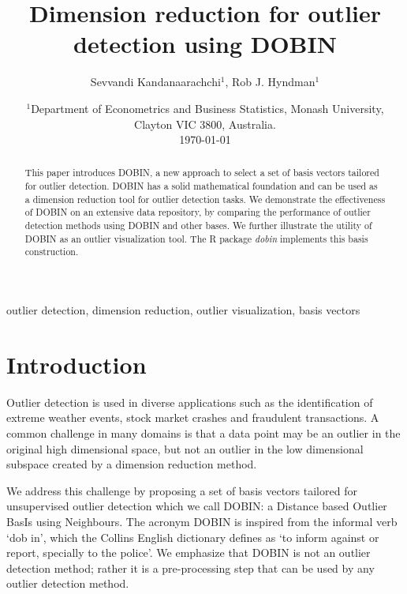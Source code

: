 \documentclass[letter,12pt]{article}
\begin{document}

\title{Dimension reduction for outlier detection using DOBIN}
\author{Sevvandi Kandanaarachchi$^1$, Rob J. Hyndman$^1$}
\date{%
   \scriptsize{ $^1$Department of Econometrics and Business Statistics, Monash University, Clayton VIC 3800, Australia.\\ [2ex]}%
    \today \\
}
\begin{titlingpage}
\maketitle

\begin{abstract}
	This paper introduces DOBIN, a new approach to select a set of basis vectors tailored for outlier detection. DOBIN has a solid mathematical foundation and can be used as a dimension reduction tool for outlier detection tasks. We demonstrate the effectiveness of DOBIN on an extensive data repository, by comparing the performance of outlier detection methods using DOBIN and other bases. We further illustrate the utility of DOBIN as an outlier visualization tool. The R package \textit{dobin} implements this basis construction.
\end{abstract}

\begin{keywords}outlier detection, dimension reduction, outlier visualization, basis vectors
\end{keywords}

\end{titlingpage}

\section{Introduction}

Outlier detection is used in diverse applications such as the identification of extreme weather events, stock market crashes and fraudulent transactions. A common challenge in many domains is that a data point may be an outlier in the original high dimensional space, but not an outlier in the low dimensional subspace created by a dimension reduction method.

We address this challenge by proposing a set of basis vectors tailored for unsupervised outlier detection which we call DOBIN: a Distance based Outlier BasIs using Neighbours. The acronym DOBIN is inspired from the informal verb `dob in', which the Collins English dictionary defines as `to inform against or report, specially to the police'. We emphasize that DOBIN is not an outlier detection method; rather it is a pre-processing step that can be used by any outlier detection method.
\end{document}

